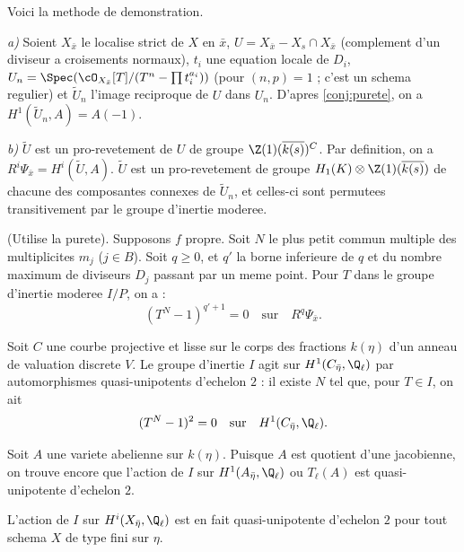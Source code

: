 Voici la methode de demonstration.

\textit{a)} Soient $X_{\bar{x}}$ le localise strict de $X$ en $\bar{x}$, $U = X_{\bar{x}} - X_s \cap X_{\bar{x}}$ (complement d'un diviseur a croisements normaux), $t_i$ une equation locale de $D_i$, $U_n = \Spec(\cO_{X_{\bar{x}}}[T]/(T^n - \prod t_i^{a_i}))$ (pour $(n,p) = 1$ ; c'est un schema regulier) et $\tilde{U}_n$ l'image reciproque de $U$ dans $U_n$. D'apres \ref{conj:purete}, on a $H^1(\tilde{U}_n, A) = A(-1)$.

\textit{b)} $\tilde{U}$ est un pro-revetement de $U$ de groupe $\Z(1)(\overline{k(s)})^C$. Par definition, on a $R^i \Psi_{\bar{x}} = H^i(\tilde{U}, A)$. $\tilde{U}$ est un pro-revetement de groupe $H_1(K) \otimes \Z(1)(\overline{k(s)})$ de chacune des composantes connexes de $\tilde{U}_n$, et celles-ci sont permutees transitivement par le groupe d'inertie moderee.

\begin{corollary}
\label{cor:3.4}
(Utilise la purete). Supposons $f$ propre. Soit $N$ le plus petit commun multiple des multiplicites $m_j$ ($j \in B$). Soit $q \geqslant 0$, et $q'$ la borne inferieure de $q$ et du nombre maximum de diviseurs $D_j$ passant par un meme point. Pour $T$ dans le groupe d'inertie moderee $I/P$, on a :
\[
(T^N - 1)^{q'+1} = 0 \quad \text{sur} \quad R^q \Psi_{\bar{x}} .
\]
\end{corollary}

\begin{theorem}
\label{thm:3.5}
Soit $C$ une courbe projective et lisse sur le corps des fractions $k(\eta)$ d'un anneau de valuation discrete $V$. Le groupe d'inertie $I$ agit sur $H^1(C_{\bar{\eta}}, \Q_\ell)$ par automorphismes quasi-unipotents d'echelon $2$ : il existe $N$ tel que, pour $T \in I$, on ait
\[
(T^N - 1)^2 = 0 \quad \text{sur} \quad H^1(C_{\bar{\eta}}, \Q_\ell) .
\]
\end{theorem}

\begin{remark}
\label{rem:3.6}
Soit $A$ une variete abelienne sur $k(\eta)$. Puisque $A$ est quotient d'une jacobienne, on trouve encore que l'action de $I$ sur $H^1(A_{\bar{\eta}}, \Q_\ell)$ ou $T_\ell(A)$ est quasi-unipotente d'echelon $2$.
\end{remark}

\begin{remark}
\label{rem:3.7}
L'action de $I$ sur $H^i(X_{\bar{\eta}}, \Q_\ell)$ est en fait quasi-unipotente d'echelon $2$ pour tout schema $X$ de type fini sur $\eta$.
\end{remark}


